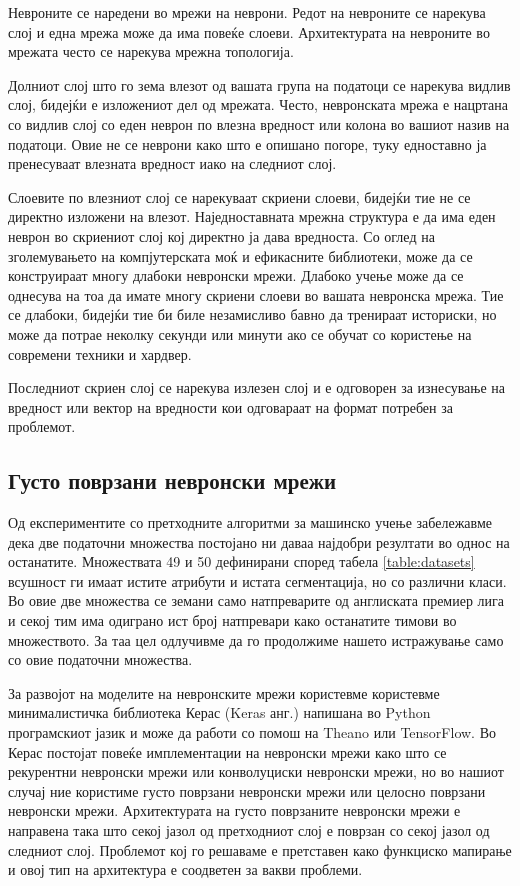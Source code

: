 Невроните се наредени во мрежи на неврони.
Редот на невроните се нарекува слој и една мрежа може да има повеќе слоеви. Архитектурата на невроните во мрежата често се нарекува мрежна топологија.

Долниот слој што го зема влезот од вашата група на податоци се нарекува видлив слој, бидејќи е изложениот дел од мрежата. Често, невронската мрежа е нацртана со видлив слој со еден неврон по влезна вредност или колона во вашиот назив на податоци. Овие не се неврони како што е опишано погоре, туку едноставно ја пренесуваат влезната вредност иако на следниот слој.

Слоевите по влезниот слој се нарекуваат скриени слоеви, бидејќи тие не се директно изложени на влезот. Наједноставната мрежна структура е да има еден неврон во скриениот слој кој директно ја дава вредноста.
Со оглед на зголемувањето на компјутерската моќ и ефикасните библиотеки, може да се конструираат многу длабоки невронски мрежи. Длабоко учење може да се однесува на тоа да имате многу скриени слоеви во вашата невронска мрежа. Тие се длабоки, бидејќи тие би биле незамисливо бавно да тренираат историски, но може да потрае неколку секунди или минути ако се обучат со користење на современи техники и хардвер.

Последниот скриен слој се нарекува излезен слој и е одговорен за изнесување на вредност или вектор на вредности кои одговараат на формат потребен за проблемот. 

\subsection{Густо поврзани невронски мрежи}

Од експериментите со претходните алгоритми за машинско учење забележавме дека две податочни множества постојано ни даваа најдобри резултати во однос на останатите. Множествата 49 и 50 дефинирани според табела \ref{table:datasets} всушност ги имаат истите атрибути и истата сегментација, но со различни класи. Во овие две множества се земани само натпреварите од англиската премиер лига и секој тим има одиграно ист број натпревари како останатите тимови во множеството. За таа цел одлучивме да го продолжиме нашето истражување само со овие податочни множества. 

За развојот на моделите на невронските мрежи користевме користевме минималистичка библиотека Керас (Keras анг.) напишана во Python програмскиот јазик и може да работи со помош на Theano или TensorFlow. Во Керас постојат повеќе имплементации на невронски мрежи како што се рекурентни невронски мрежи или конволуциски невронски мрежи, но во нашиот случај ние користиме густо поврзани невронски мрежи или целосно поврзани невронски мрежи. Архитектурата на густо поврзаните невронски мрежи е направена така што секој јазол од претходниот слој е поврзан со секој јазол од следниот слој. Проблемот кој го решаваме е претставен како функциско мапирање и овој тип на архитектура е соодветен за вакви проблеми.


